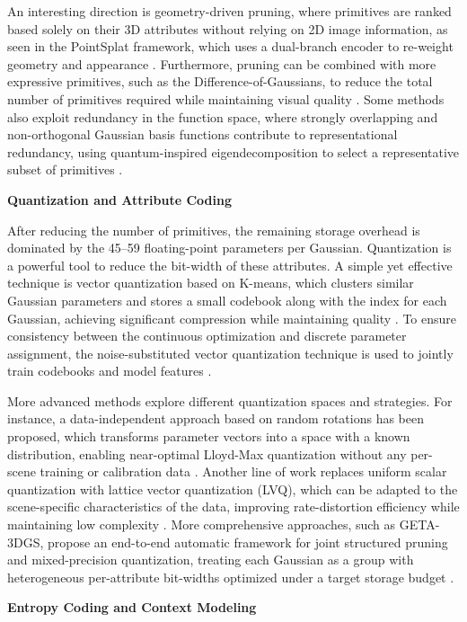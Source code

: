 \documentclass[11pt]{article}
\begin{document}
An interesting direction is geometry-driven pruning, where primitives are ranked based solely on their 3D attributes without relying on 2D image information, as seen in the PointSplat framework, which uses a dual-branch encoder to re-weight geometry and appearance \cite{ref431}. Furthermore, pruning can be combined with more expressive primitives, such as the Difference-of-Gaussians, to reduce the total number of primitives required while maintaining visual quality \cite{ref432}. Some methods also exploit redundancy in the function space, where strongly overlapping and non-orthogonal Gaussian basis functions contribute to representational redundancy, using quantum-inspired eigendecomposition to select a representative subset of primitives \cite{ref433}.

\textbf{Quantization and Attribute Coding}

After reducing the number of primitives, the remaining storage overhead is dominated by the 45--59 floating-point parameters per Gaussian. Quantization is a powerful tool to reduce the bit-width of these attributes. A simple yet effective technique is vector quantization based on K-means, which clusters similar Gaussian parameters and stores a small codebook along with the index for each Gaussian, achieving significant compression while maintaining quality \cite{ref434}. To ensure consistency between the continuous optimization and discrete parameter assignment, the noise-substituted vector quantization technique is used to jointly train codebooks and model features \cite{ref427}.

More advanced methods explore different quantization spaces and strategies. For instance, a data-independent approach based on random rotations has been proposed, which transforms parameter vectors into a space with a known distribution, enabling near-optimal Lloyd-Max quantization without any per-scene training or calibration data \cite{ref435}. Another line of work replaces uniform scalar quantization with lattice vector quantization (LVQ), which can be adapted to the scene-specific characteristics of the data, improving rate-distortion efficiency while maintaining low complexity \cite{ref436}. More comprehensive approaches, such as GETA-3DGS, propose an end-to-end automatic framework for joint structured pruning and mixed-precision quantization, treating each Gaussian as a group with heterogeneous per-attribute bit-widths optimized under a target storage budget \cite{ref437}.

\textbf{Entropy Coding and Context Modeling}
\end{document}
